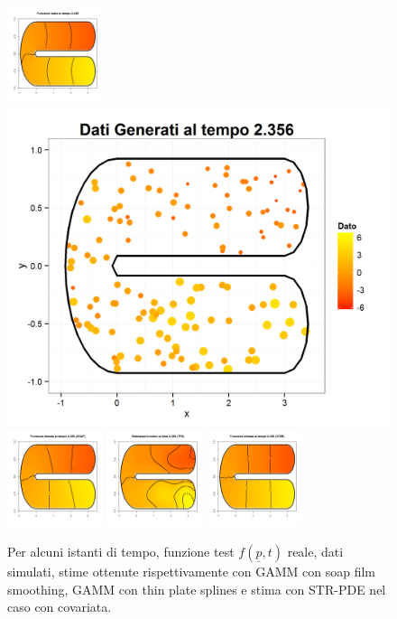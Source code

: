 \documentclass[a4paper,11pt,twoside,openright]{book}							%
\begin{document}
\begin{landscape}
\begin{figure}
\includegraphics[width=0.25\textwidth]{immagini/simulazioni_covar/REALEtempo4.png}
\includegraphics[height=0.25\textwidth]{immagini/simulazioni_covar/Dati_tempo4.png}
\includegraphics[width=0.25\textwidth]{immagini/simulazioni_covar/SOAPtempo4.png}
\includegraphics[width=0.25\textwidth]{immagini/simulazioni_covar/TPStempo4.png}
\includegraphics[width=0.25\textwidth]{immagini/simulazioni_covar/STSRtempo4.png}

\caption{Per alcuni istanti di tempo, funzione test $f(\underline p,t)$ reale, dati simulati, stime ottenute rispettivamente con GAMM con soap film smoothing, GAMM con thin plate splines e stima con STR-PDE nel caso con covariata.}
\label{fig:confronto_altri_metodi_cov}
\end{figure}
\end{landscape}
\end{document}
